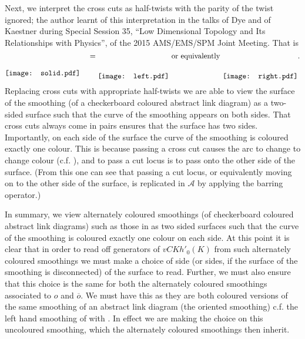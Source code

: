 \documentclass[10pt,oneside]{amsart}
\theoremstyle{definition}
\numberwithin{equation}{section}
\begin{document}
Next, we interpret the cross cuts as half-twists with the parity of the twist ignored; the author learnt of this interpretation in the talks of Dye and of Kaestner during Special Session 35, ``Low Dimensional Topology and Its Relationships with Physics'', of the 2015 AMS/EMS/SPM Joint Meeting. That is
\[
	\raisebox{-22.5pt}{\texttt{[image: solid.pdf]}} \quad = \raisebox{-26.5pt}{\texttt{[image: left.pdf]}} ~\text{or equivalently}~ \raisebox{-26.5pt}{\texttt{[image: right.pdf]}}.
\]
Replacing cross cuts with appropriate half-twists we are able to view the surface of the smoothing (of a checkerboard coloured abstract link diagram) as a two-sided surface such that the curve of the smoothing appears on both sides. That cross cuts always come in pairs ensures that the surface has two sides. Importantly, on each side of the surface the curve of the smoothing is coloured exactly one colour. This is because passing a cross cut causes the arc to change to change colour (c.f. ), and to pass a cut locus is to pass onto the other side of the surface. (From this one can see that passing a cut locus, or equivalently moving on to the other side of the surface, is replicated in  \( \mathcal{A} \) by applying the barring operator.)

In summary, we view alternately coloured smoothings (of checkerboard coloured abstract link diagrams) such as those in  as two sided surfaces such that the curve of the smoothing is coloured exactly one colour on each side. At this point it is clear that in order to read off generators of \( {{vCKh} '}_0 ( K ) \) from such alternately coloured smoothings we must make a choice of side (or sides, if the surface of the smoothing is disconnected) of the surface to read. Further, we must also ensure that this choice is the same for both the alternately coloured smoothings associated to \( o \) and \( \overline{o} \). We must have this as they are both coloured versions of the same smoothing of an abstract link diagram (the oriented smoothing) c.f. the left hand smoothing of  with . In effect we are making the choice on this uncoloured smoothing, which the alternately coloured smoothings then inherit.
\end{document}
